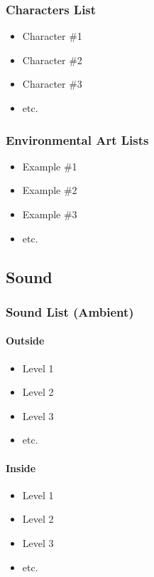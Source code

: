 \documentclass[14pt]{article}
\begin{document}
\subsubsection{Characters List}
\begin{itemize}
    \item Character \#1
    \item Character \#2
    \item Character \#3
    \item etc.
\end{itemize}

\subsubsection{Environmental Art Lists}
\begin{itemize}
    \item Example \#1
    \item Example \#2
    \item Example \#3
    \item etc.
\end{itemize}

\subsection{Sound}
\subsubsection{Sound List (Ambient)}
\paragraph{Outside}
\begin{itemize}
    \item Level 1
    \item Level 2
    \item Level 3
    \item etc.
\end{itemize}

\paragraph{Inside}
\begin{itemize}
    \item Level 1
    \item Level 2
    \item Level 3
    \item etc.
\end{itemize}
\end{document}

